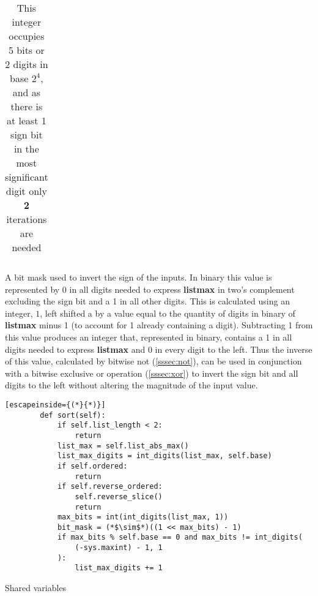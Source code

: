 \documentclass[12pt]{article}
\begin{document}
\begin{description}
\begin{table}[!htb]
\begin{minipage}{.45\textwidth}
\begin{tabular}[t]{cccc}
				\end{tabular}%
				\vspace{0.1cm}
				\caption*{This integer occupies 5 bits or 2 digits in base $2^4$, and as there is at least 1 sign bit in the most significant digit only \textbf{2} iterations are needed}
			\end{minipage}\hfill%
		
		\end{table}

		\item[bit\textunderscore mask] A bit mask used to invert the sign of the inputs. In binary this value is represented by 0 in all digits needed to express \textbf{list\textunderscore max} in two's complement excluding the sign bit and a 1 in all other digits. This is calculated using an integer, $1$, left shifted a by a value equal to the quantity of digits in binary of \textbf{list\textunderscore max} minus 1 (to account for 1 already containing a digit). Subtracting 1 from this value produces an integer that, represented in binary, contains a 1 in all digits needed to express \textbf{list\textunderscore max} and 0 in every digit to the left. Thus the inverse of this value, calculated by bitwise not (\ref{sssec:not}), can be used in conjunction with a bitwise exclusive or operation (\ref{sssec:xor}) to invert the sign bit and all digits to the left without altering the magnitude of the input value.
	\end{description}
	\begin{table}[H]
		\lstset{
			language=python,
		numbers=left,
		stepnumber=1,
		showstringspaces=false,
		tabsize=3,
		breaklines=true,
		breakatwhitespace=false,
		}
		\centering
		\begin{lstlisting}[escapeinside={(*}{*)}]
		def sort(self):
			if self.list_length < 2:
				return
			list_max = self.list_abs_max()
			list_max_digits = int_digits(list_max, self.base)
			if self.ordered:
				return
			if self.reverse_ordered:
				self.reverse_slice()
				return
			max_bits = int(int_digits(list_max, 1))
			bit_mask = (*$\sim$*)((1 << max_bits) - 1)
			if max_bits % self.base == 0 and max_bits != int_digits(
				(-sys.maxint) - 1, 1
			):
				list_max_digits += 1
		\end{lstlisting}
		\caption*{Shared variables}
		\end{table}
\end{document}
